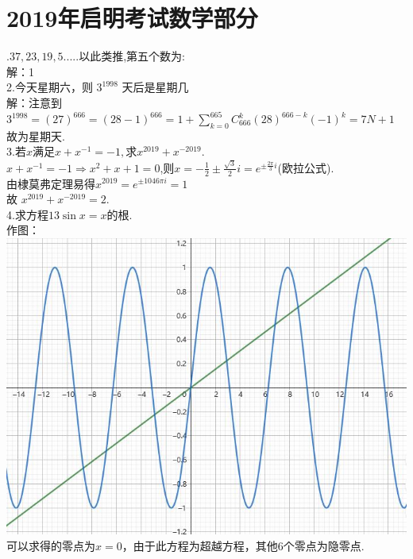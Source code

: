 \documentclass[a4paper,11pt,UTF8]{article}
\begin{document}
\section*{2019年启明考试数学部分}
.$37,23,19,5.....$以此类推,第五个数为:\\
解：1\\
2.今天星期六，则 $3^{1998}$ 天后是星期几\\
解：注意到$\displaystyle3^{1998}=(27)^{666}=(28-1)^{666}=1+\sum_{k=0}^{665}C_{666}^k(28)^{666-k}(-1)^k=7N+1$\\
故为星期天.\\
3.$\text{若}x\text{满足}x+x^{-1}=-1,\text{求}x^{2019}+x^{-2019}.$\\
$x+x^{-1}=-1\Rightarrow x^2+x+1=0$,则$\displaystyle x=-\frac12\pm\frac{\sqrt{3}}2i=e^{\pm\frac{2\pi}3i}$(欧拉公式).\\
由棣莫弗定理易得$x^{2019}=e^{\pm1046\pi i}=1$\\
故 $x^{2019}+x^{-2019}=2$.\\
4.$\text{求方程}13\sin x=x\text{的根}.$\\
作图： \\
\includegraphics[scale=0.7]{./2019_4.jpg}\\
可以求得的零点为$x=0$，由于此方程为超越方程，其他6个零点为隐零点.\\
\end{document}
